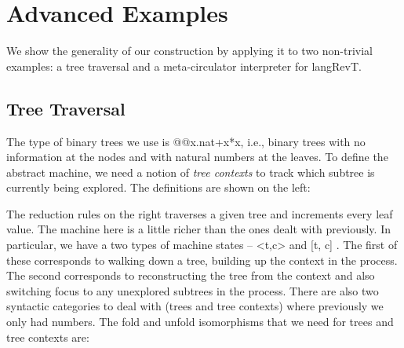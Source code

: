 \documentclass{llncs}
\begin{document}
\begin{center}
\end{center}


\section{Advanced Examples} 

We show the generality of our construction by applying it to two non-trivial
examples: a tree traversal and a meta-circulator interpreter for
{{langRevT}}.

\subsection{Tree Traversal}

The type of binary trees we use is {{@@x.nat+x*x}}, i.e., binary trees with
no information at the nodes and with natural numbers at the leaves. To define
the abstract machine, we need a notion of \emph{tree contexts} to track which
subtree is currently being explored. The definitions are shown on the left:

\begin{multicols}{2}
%


\end{multicols}

The reduction rules on the right traverses a given tree and increments
every leaf value.  The machine here is a little richer than the ones
dealt with previously. In particular, we have a two types of machine
states -- {{<t,c>}} and {{ {[t, c]} }}. The first of these corresponds
to walking down a tree, building up the context in the process. The
second corresponds to reconstructing the tree from the context and
also switching focus to any unexplored subtrees in the process. There
are also two syntactic categories to deal with (trees and tree
contexts) where previously we only had numbers. The {{fold}} and
{{unfold}} isomorphisms that we need for trees and tree contexts are:
\end{document}
